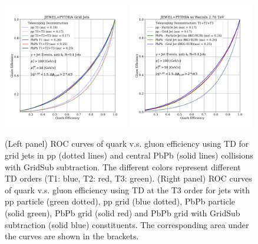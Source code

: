 \documentclass[notoc]{JHEP3}
\begin{document}
\begin{figure}[t]
	\centering
        \includegraphics[width=0.49\textwidth]{plots/JEWELPYTHIA_TD_2p76TeV_ppvsPbPb.pdf}
        \includegraphics[width=0.49\textwidth]{plots/JEWELPYTHIA_TD123_2p76TeV_ppvsPbPb_comp_QvsG.pdf}
	\caption{(Left panel) ROC curves of quark v.s. gluon efficiency using TD for grid jets in pp (dotted lines) and central PbPb (solid lines) collisions with GridSub subtraction. The different colors represent different TD orders (T1: blue, T2: red, T3: green). (Right panel) ROC curves of quark v.s. gluon efficiency using TD at the T3 order for jets with pp particle (green dotted), pp grid (blue dotted), PbPb particle (solid green), PbPb grid (solid red) and PbPb grid with GridSub subtraction (solid blue) constituents. The corresponding area under the curves are shown in the brackets.}
	\label{fig:ROC_TD_grid}
\end{figure}
\end{document}
